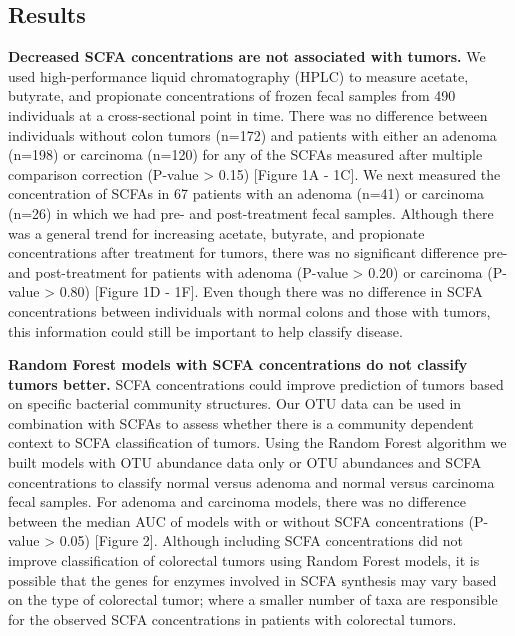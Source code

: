\documentclass[11pt,]{article}
\begin{document}
\newpage

\subsection{Results}\label{results}

\textbf{Decreased SCFA concentrations are not associated with tumors.}
We used high-performance liquid chromatography (HPLC) to measure
acetate, butyrate, and propionate concentrations of frozen fecal samples
from 490 individuals at a cross-sectional point in time. There was no
difference between individuals without colon tumors (n=172) and patients
with either an adenoma (n=198) or carcinoma (n=120) for any of the SCFAs
measured after multiple comparison correction (P-value \textgreater{}
0.15) {[}Figure 1A - 1C{]}. We next measured the concentration of SCFAs
in 67 patients with an adenoma (n=41) or carcinoma (n=26) in which we
had pre- and post-treatment fecal samples. Although there was a general
trend for increasing acetate, butyrate, and propionate concentrations
after treatment for tumors, there was no significant difference pre- and
post-treatment for patients with adenoma (P-value \textgreater{} 0.20)
or carcinoma (P-value \textgreater{} 0.80) {[}Figure 1D - 1F{]}. Even
though there was no difference in SCFA concentrations between
individuals with normal colons and those with tumors, this information
could still be important to help classify disease.

\textbf{Random Forest models with SCFA concentrations do not classify
tumors better.} SCFA concentrations could improve prediction of tumors
based on specific bacterial community structures. Our OTU data can be
used in combination with SCFAs to assess whether there is a community
dependent context to SCFA classification of tumors. Using the Random
Forest algorithm we built models with OTU abundance data only or OTU
abundances and SCFA concentrations to classify normal versus adenoma and
normal versus carcinoma fecal samples. For adenoma and carcinoma models,
there was no difference between the median AUC of models with or without
SCFA concentrations (P-value \textgreater{} 0.05) {[}Figure 2{]}.
Although including SCFA concentrations did not improve classification of
colorectal tumors using Random Forest models, it is possible that the
genes for enzymes involved in SCFA synthesis may vary based on the type
of colorectal tumor; where a smaller number of taxa are responsible for
the observed SCFA concentrations in patients with colorectal tumors.
\end{document}
